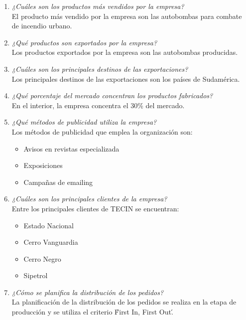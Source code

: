 \documentclass[a4paper,10pt]{article}
\begin{document}
		
			\begin{enumerate}[resume]
			
				\item \textit{¿Cuáles son los productos más vendidos por la empresa?}\\
				El producto más vendido por la empresa son las autobombas para combate de incendio urbano.
				
				\item \textit{¿Qué productos son exportados por la empresa?}\\
				Los productos exportados por la empresa son las autobombas producidas.
				
				\item \textit{¿Cuáles son los principales destinos de las exportaciones?}\\
				Los principales destinos de las exportaciones son los países de Sudamérica.
				
				\item \textit{¿Qué porcentaje del mercado concentran los productos fabricados?}\\
				En el interior, la empresa concentra el 30\% del mercado.
				
				\item \textit{¿Qué métodos de publicidad utiliza la empresa?}\\
				Los métodos de publicidad que emplea la organización son:
				\begin{itemize}
					\item Avisos en revistas especializada
					\item Exposiciones
					\item Campañas de emailing
				\end{itemize}
				
				\item \textit{¿Cuáles son los principales clientes de la empresa?}\\
				Entre los principales clientes de TECIN se encuentran:
				\begin{itemize}
					\item Estado Nacional
					\item Cerro Vanguardia
					\item Cerro Negro
					\item Sipetrol
				\end{itemize}
				
				\item \textit{¿Cómo se planifica la distribución de los pedidos?}\\	
				La planificación de la distribución de los pedidos se realiza en la etapa de producción y se utiliza el criterio \'First In, First Out\'.
				
			\end{enumerate}
			
\end{document}
